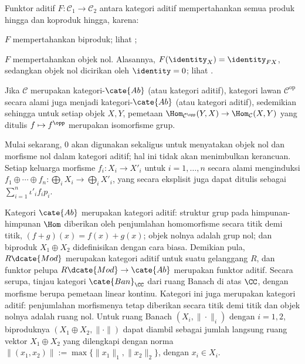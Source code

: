 Funktor aditif $F: \mathcal{C}_1 \to \mathcal{C}_2$ antara kategori aditif
mempertahankan semua produk hingga dan koproduk hingga, karena:
\begin{compactitem}
	\item $F$ mempertahankan biproduk; lihat
	\cite[Proposisi 3.4.13]{Li1};
	\item $F$ mempertahankan objek nol. Alasannya, $F(\identity_X) =
	\identity_{FX}$, sedangkan objek nol dicirikan oleh $\identity=0$; lihat
	\cite[Lema 3.4.11]{Li1}.
\end{compactitem}

Jika $\mathcal{C}$ merupakan kategori-$\cate{Ab}$ (atau kategori aditif),
kategori lawan $\mathcal{C}^{\text{op}}$ secara alami juga menjadi
kategori-$\cate{Ab}$ (atau kategori aditif), sedemikian sehingga untuk setiap
objek $X,Y$, pemetaan
$\Hom_{\mathcal{C}^{\opp}}(Y,X) \to \Hom_{\mathcal{C}}(X,Y)$ yang ditulis
$f \mapsto f^{\opp}$ merupakan isomorfisme grup.

Mulai sekarang, $0$ akan digunakan sekaligus untuk menyatakan objek nol dan
morfisme nol dalam kategori aditif; hal ini tidak akan menimbulkan kerancuan.
Setiap keluarga morfisme $f_i: X_i \to X'_i$ untuk $i=1,\ldots,n$ secara
alami menginduksi
$f_1 \oplus \cdots \oplus f_n: \bigoplus_i X_i \to \bigoplus_i X'_i$,
yang secara eksplisit juga dapat ditulis sebagai
$\sum_{i=1}^n \iota'_i f_i p_i$.

\begin{contoh}\label{eg:additive-category}
	Kategori $\cate{Ab}$ merupakan kategori aditif: struktur grup pada
	himpunan-himpunan $\Hom$ diberikan oleh penjumlahan homomorfisme secara
	titik demi titik, $(f+g)(x)=f(x)+g(x)$; objek nolnya adalah grup nol; dan
	biproduk $X_1 \oplus X_2$ didefinisikan dengan cara biasa. Demikian pula,
	$R\dcate{Mod}$ merupakan kategori aditif untuk suatu gelanggang $R$, dan
	funktor pelupa $R\dcate{Mod} \to \cate{Ab}$ merupakan funktor aditif.
	Secara serupa, tinjau kategori $\cate{Ban}_{\CC}$ dari ruang Banach di atas
	$\CC$, dengan morfisme berupa pemetaan linear kontinu. Kategori ini juga
	merupakan kategori aditif: penjumlahan morfismenya tetap diberikan secara
	titik demi titik dan objek nolnya adalah ruang nol. Untuk ruang Banach
	$(X_i, \|\cdot\|_i)$ dengan $i=1,2$, biproduknya
	$(X_1 \oplus X_2, \|\cdot\|)$ dapat diambil sebagai jumlah langsung ruang
	vektor $X_1 \oplus X_2$ yang dilengkapi dengan norma
	$\|(x_1,x_2)\| := \max\{\|x_1\|_1,\|x_2\|_2\}$, dengan $x_i \in X_i$.
\end{contoh}

